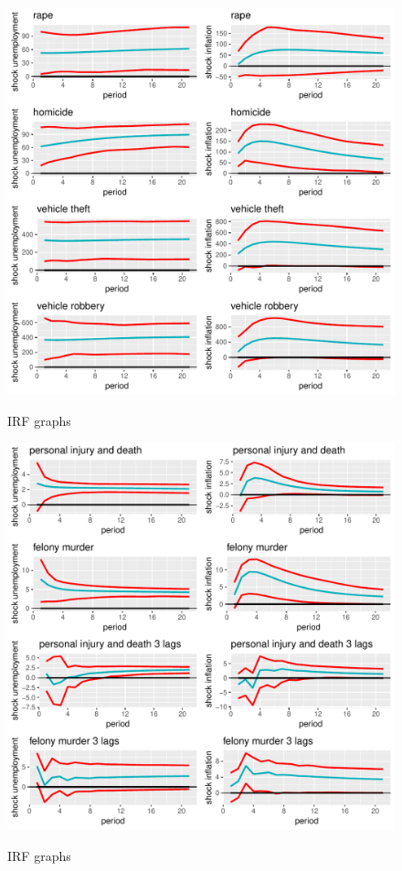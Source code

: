 \documentclass[11pt, a4paper]{article}
\begin{document}
\begin{figure}[H]
\caption{IRF graphs}
\centering
\includegraphics[width=15cm]{graph_irf1}
\label{fig:graph_irf1}
\end{figure}




\begin{figure}[H]
\caption{IRF graphs}
\centering
\includegraphics[width=15cm]{graph_irf2}
\label{fig:graph_irf2}
\end{figure}
\end{document}
